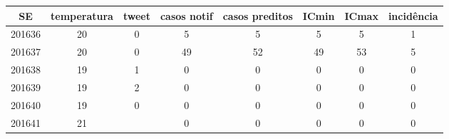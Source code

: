 \begin{tabular}{c|ccccccc}
  \hline
SE & temperatura & tweet & casos notif & casos preditos & ICmin & ICmax & incidência \\ 
  \hline
201636 & 20 & 0 & 5 & 5 & 5 & 5 & 1 \\ 
  201637 & 20 & 0 & 49 & 52 & 49 & 53 & 5 \\ 
  201638 & 19 & 1 & 0 & 0 & 0 & 0 & 0 \\ 
  201639 & 19 & 2 & 0 & 0 & 0 & 0 & 0 \\ 
  201640 & 19 & 0 & 0 & 0 & 0 & 0 & 0 \\ 
  201641 & 21 &  & 0 & 0 & 0 & 0 & 0 \\ 
   \hline
\end{tabular}
